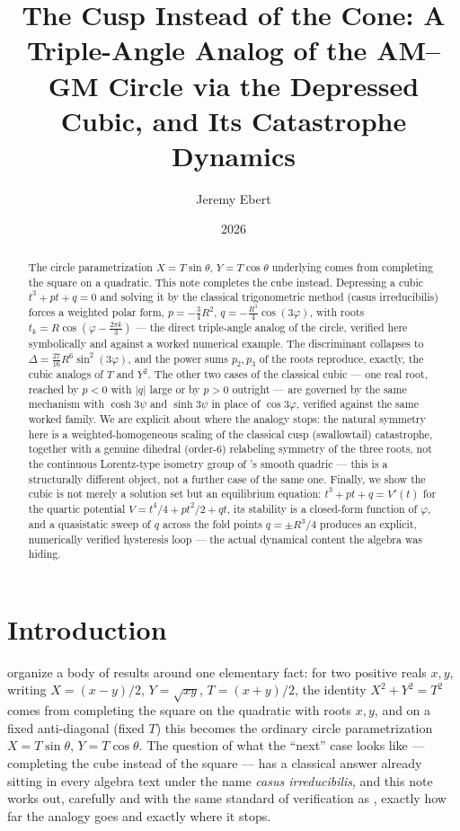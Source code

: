 \documentclass[11pt]{amsart}
\title[The Cusp Instead of the Cone]{The Cusp Instead of the Cone: A Triple-Angle Analog of the AM--GM Circle via the Depressed Cubic, and Its Catastrophe Dynamics}
\author{Jeremy Ebert}
\date{2026}
\theoremstyle{remark}
\begin{document}
\maketitle

\begin{abstract}
The circle parametrization $X=T\sin\theta$, $Y=T\cos\theta$ underlying \cite{Ebert2026Table,Ebert2026EigenCoord} comes from completing the square on a quadratic. This note completes the cube instead. Depressing a cubic $t^3+pt+q=0$ and solving it by the classical trigonometric method (casus irreducibilis) forces a weighted polar form, $p=-\tfrac34R^2$, $q=-\tfrac{R^3}4\cos(3\varphi)$, with roots $t_k=R\cos(\varphi-\tfrac{2\pi k}3)$ --- the direct triple-angle analog of the circle, verified here symbolically and against a worked numerical example. The discriminant collapses to $\Delta=\tfrac{27}{16}R^6\sin^2(3\varphi)$, and the power sums $p_2,p_3$ of the roots reproduce, exactly, the cubic analogs of $T$ and $Y^2$. The other two cases of the classical cubic --- one real root, reached by $p<0$ with $|q|$ large or by $p>0$ outright --- are governed by the same mechanism with $\cosh3\psi$ and $\sinh3\psi$ in place of $\cos3\varphi$, verified against the same worked family. We are explicit about where the analogy stops: the natural symmetry here is a weighted-homogeneous scaling of the classical cusp (swallowtail) catastrophe, together with a genuine dihedral (order-$6$) relabeling symmetry of the three roots, not the continuous Lorentz-type isometry group of \cite{Ebert2026EigenCoord}'s smooth quadric --- this is a structurally different object, not a further case of the same one. Finally, we show the cubic is not merely a solution set but an equilibrium equation: $t^3+pt+q=V'(t)$ for the quartic potential $V=t^4/4+pt^2/2+qt$, its stability is a closed-form function of $\varphi$, and a quasistatic sweep of $q$ across the fold points $q=\pm R^3/4$ produces an explicit, numerically verified hysteresis loop --- the actual dynamical content the algebra was hiding.
\end{abstract}

\section{Introduction}

\cite{Ebert2026Table,Ebert2026EigenCoord} organize a body of results around one elementary fact: for two positive reals $x,y$, writing $X=(x-y)/2$, $Y=\sqrt{xy}$, $T=(x+y)/2$, the identity $X^2+Y^2=T^2$ comes from completing the square on the quadratic with roots $x,y$, and on a fixed anti-diagonal (fixed $T$) this becomes the ordinary circle parametrization $X=T\sin\theta$, $Y=T\cos\theta$. The question of what the ``next'' case looks like --- completing the cube instead of the square --- has a classical answer already sitting in every algebra text under the name \emph{casus irreducibilis}, and this note works out, carefully and with the same standard of verification as \cite{Ebert2026Table,Ebert2026EigenCoord}, exactly how far the analogy goes and exactly where it stops.
\end{document}
